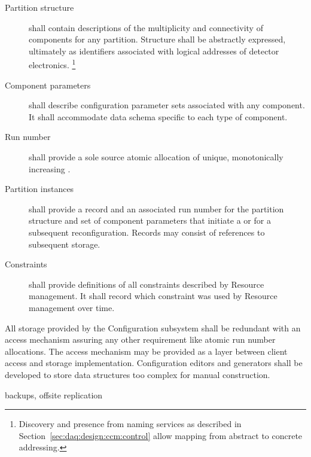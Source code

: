 \begin{description}

\item[Partition structure] shall contain descriptions of the multiplicity and connectivity of  components for any partition. 
  Structure shall be abstractly expressed, ultimately as identifiers associated with logical addresses of detector electronics. \footnote{Discovery and presence from naming services as described in Section~\ref{sec:daq:design:ccm:control} allow mapping from abstract to concrete addressing.}

\item[Component parameters] shall describe configuration parameter sets associated with any  component.  It shall accommodate data schema specific to each type of component. 

\item[Run number] shall provide a sole source atomic allocation of unique, monotonically increasing .

\item[Partition instances] shall provide a record and an associated run number for the partition structure and set of component parameters that initiate a  or for a subsequent reconfiguration.  Records may consist of references to subsequent storage.

\item[Constraints] shall provide definitions of all constraints described by Resource management. 
  It shall record which constraint was used by Resource management over time. 
\end{description}


All storage provided by the Configuration subsystem shall be redundant with an access mechanism assuring any other requirement like atomic run number allocations. 
The access mechanism may be provided as a layer between client access and storage implementation.
Configuration editors and generators shall be developed to store data structures too complex for manual construction.

backups, offsite replication


